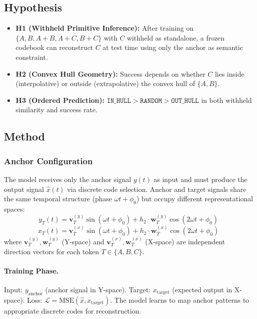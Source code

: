 \documentclass{article}
\begin{document}
\subsection{Hypothesis}
\begin{itemize}
    \item \textbf{H1 (Withheld Primitive Inference):} After training on $\{A, B, A{+}B, \allowbreak A{+}C, \allowbreak B{+}C\}$ with $C$ withheld as standalone, a frozen codebook can reconstruct $C$ at test time using only the anchor as semantic constraint.
    \item \textbf{H2 (Convex Hull Geometry):} Success depends on whether $C$ lies inside (interpolative) or outside (extrapolative) the convex hull of $\{A, B\}$.
    \item \textbf{H3 (Ordered Prediction):} $\texttt{IN\_HULL} > \texttt{RANDOM} > \texttt{OUT\_HULL}$ in both withheld similarity and success rate.
\end{itemize}

\subsection{Method}

\subsubsection{Anchor Configuration}
The model receives only the anchor signal $y(t)$ as input and must produce the output signal $\hat{x}(t)$ via discrete code selection.
Anchor and target signals share the same temporal structure (phase $\omega t + \phi_0$) but occupy different representational spaces:
\begin{equation}
    y_T(t) = \mathbf{v}^{(y)}_T \sin(\omega t + \phi_0) + h_2 \cdot \mathbf{w}^{(y)}_T \cos(2\omega t + \phi_0)
\end{equation}
\begin{equation}
    x_T(t) = \mathbf{v}^{(x)}_T \sin(\omega t + \phi_0) + h_2 \cdot \mathbf{w}^{(x)}_T \cos(2\omega t + \phi_0)
\end{equation}
where $\mathbf{v}^{(y)}_T, \mathbf{w}^{(y)}_T$ (Y-space) and $\mathbf{v}^{(x)}_T, \mathbf{w}^{(x)}_T$ (X-space) are independent direction vectors for each token $T \in \{A, B, C\}$.

\paragraph{Training Phase.}
Input: $y_{\text{anchor}}$ (anchor signal in Y-space).
Target: $x_{\text{target}}$ (expected output in X-space).
Loss: $\mathcal{L} = \text{MSE}(\hat{x}, x_{\text{target}})$.
The model learns to map anchor patterns to appropriate discrete codes for reconstruction.
\end{document}
